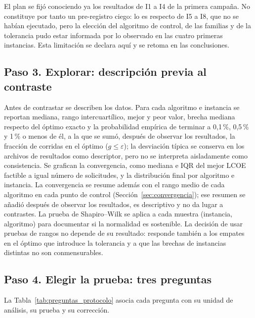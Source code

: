El plan se fijó conociendo ya los resultados de I1 a I4 de la primera campaña. No constituye por tanto un pre-registro ciego: lo es respecto de I5 a I8, que no se habían ejecutado, pero la elección del algoritmo de control, de las familias y de la tolerancia pudo estar informada por lo observado en las cuatro primeras instancias. Esta limitación se declara aquí y se retoma en las conclusiones.

\subsection{Paso 3. Explorar: descripción previa al contraste}

Antes de contrastar se describen los datos. Para cada algoritmo e instancia se reportan mediana, rango intercuartílico, mejor y peor valor, brecha mediana respecto del óptimo exacto y la probabilidad empírica de terminar a 0,1\,\%, 0,5\,\% y 1\,\% o menos de él, a la que se sumó, después de observar los resultados, la fracción de corridas en el óptimo ($g\leq\varepsilon$); la desviación típica se conserva en los archivos de resultados como descriptor, pero no se interpreta aisladamente como consistencia. Se grafican la convergencia, como mediana e IQR del mejor LCOE factible a igual número de solicitudes, y la distribución final por algoritmo e instancia. La convergencia se resume además con el rango medio de cada algoritmo en cada punto de control (Sección~\ref{sec:convergencia}); ese resumen se añadió después de observar los resultados, es descriptivo y no da lugar a contrastes. La prueba de Shapiro--Wilk se aplica a cada muestra (instancia, algoritmo) para documentar si la normalidad es sostenible. La decisión de usar pruebas de rangos no depende de su resultado: responde también a los empates en el óptimo que introduce la tolerancia y a que las brechas de instancias distintas no son conmensurables.

\subsection{Paso 4. Elegir la prueba: tres preguntas}

La Tabla~\ref{tab:preguntas_protocolo} asocia cada pregunta con su unidad de análisis, su prueba y su corrección.

